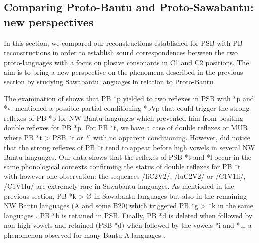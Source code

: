 \documentclass[output=paper,colorlinks,citecolor=brown
]{langscibook}
\begin{document}
\subsection{Comparing Proto-Bantu and Proto-Sawabantu: new perspectives} \label{sect:browngrollemundrule:newperspectives}

In this section, we compared our reconstructions established for PSB with PB reconstructions in order to establish sound correspondences between the two proto-languages with a focus on plosive consonants in C1 and C2 positions. The aim is to bring a new perspective on the phenomena described in the previous section by studying Sawabantu languages in relation to Proto-Bantu. 

The examination of  shows that PB *p yielded to two reflexes in PSB with *p and *v. \cite[25-26]{philippson2022} mentioned a possible partial conditioning *pVp that could trigger the strong reflexes of PB *p for NW Bantu languages which prevented him from positing double reflexes for PB *p. For PB *t, we have a case of double reflexes or MUR where PB *t > PSB *t or *l with no apparent conditioning. However, \citet[30]{philippson2022} did notice that the strong reflexes of PB *t tend to appear before high vowels in several NW Bantu languages. Our data shows that the reflexes of PSB *t and *l occur in the same phonological contexts confirming the status of double reflexes for PB *t with however one observation: the sequences /liC2V2/, /luC2V2/ or /C1V1li/, /C1V1lu/ are extremely rare in Sawabantu languages. As mentioned in the previous section, PB *k > Ø in Sawabantu languages but also in the remaining NW Bantu languages (A and some B20) which triggered PB *g > *k in the same languages \citep{grollemundandphilippsonforth2}. PB *b is retained in PSB. Finally, PB *d is deleted when followed by non-high vowels and retained (PSB *d) when followed by the vowels *i and *u, a phenomenon observed for many Bantu A languages \citep[30-31]{philippson2022}. 
\end{document}
